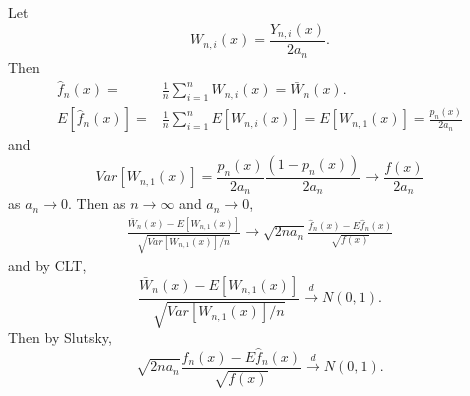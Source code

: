 \documentclass{article}
\newcommand{\hf}{\hat{f}}
\newcommand{\dto}{\overset{d}{\to}}
\begin{document}
Let
\[
  W_{n,i}(x) = \frac{Y_{n,i}(x)}{2a_n}.
\]
Then
\begin{align*}
  \hf_n(x) = & \frac{1}{n} \sum_{i=1}^n W_{n,i}(x) = \bar{W}_n(x).
  \\ E[\hf_n(x)] = & \frac{1}{n} \sum_{i=1}^n E[W_{n,i}(x)] = E[W_{n,1}(x)] =  \frac{p_n(x)}{2a_n}
\end{align*}
and
\[
  Var[W_{n,1}(x)] = \frac{p_n(x)}{2a_n} \frac{(1-p_n(x))}{2a_n} \to
  \frac{f(x)}{2a_n}
\]
as $a_n \to 0$.  Then as $n \to \infty$ and $a_n \to 0$,
\begin{align*}
  \frac{\bar{W}_n(x) - E[W_{n,1}(x)]}{\sqrt{Var[W_{n,1}(x)] / n}}
  \to \sqrt{2na_n} \frac{\hf_n(x) - E\hf_n(x)}{\sqrt{f(x)}} 
\end{align*}
and by CLT,
\[
  \frac{\bar{W}_n(x) - E[W_{n,1}(x)]}{\sqrt{Var[W_{n,1}(x)] / n}} \dto
  N(0,1).
\]
Then by Slutsky,
\[
  \sqrt{2na_n} \frac{\hf_n(x) - E\hf_n(x)}{\sqrt{f(x)}} \dto N(0,1).
\]
\end{document}
